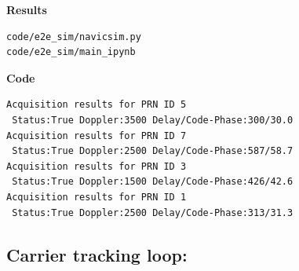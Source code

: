 \textbf{Results}
\begin{lstlisting}
code/e2e_sim/navicsim.py
code/e2e_sim/main_ipynb
\end{lstlisting}
\textbf{Code}
\begin{lstlisting}
Acquisition results for PRN ID 5
 Status:True Doppler:3500 Delay/Code-Phase:300/30.0
Acquisition results for PRN ID 7
 Status:True Doppler:2500 Delay/Code-Phase:587/58.7
Acquisition results for PRN ID 3
 Status:True Doppler:1500 Delay/Code-Phase:426/42.6
Acquisition results for PRN ID 1
 Status:True Doppler:2500 Delay/Code-Phase:313/31.3
\end{lstlisting}


\subsection{Carrier tracking loop:}

